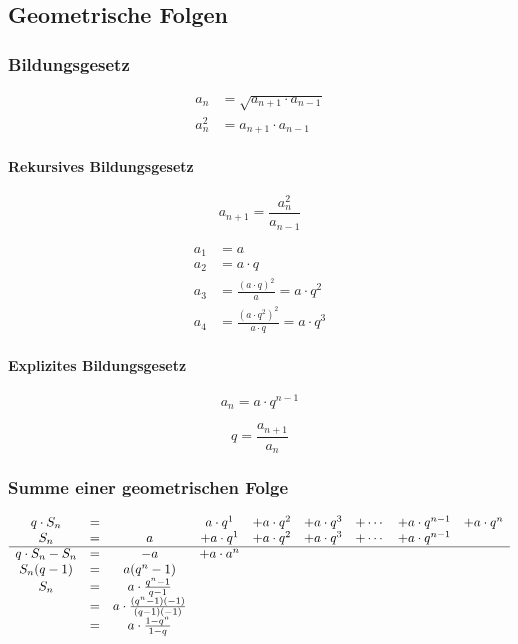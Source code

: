 \subsection{Geometrische Folgen}

\subsubsection{Bildungsgesetz}

\begin{align*}
    a_n &= \sqrt{a_{n+1} \cdot a_{n-1}} \\
    a_n^2 &= a_{n+1} \cdot a_{n-1}
\end{align*}

\begin{gesetz}
    \paragraph{Rekursives Bildungsgesetz}
    \[
        a_{n+1} = \frac{a_n^2}{a_{n-1}}  
    \]
\end{gesetz}

\begin{align*}
    a_1 &= a \\
    a_2 &= a \cdot q \\
    a_3 &= \frac{{(a \cdot q)}^2}{a} = a \cdot q^2 \\
    a_4 &= \frac{{(a \cdot q^2)}^2}{a \cdot q} = a \cdot q^3
\end{align*}

\begin{gesetz}
    \paragraph{Explizites Bildungsgesetz}
    \[
        a_n = a \cdot q^{n-1}  
    \]
\end{gesetz}

\[
    q = \frac{a_{n+1}}{a_n}
\]

\subsubsection{Summe einer geometrischen Folge}

\[
    \begin{array}{ccccccccc}
        q \cdot S_n &=& & a \cdot q^1 &+ a \cdot q^2 &+ a \cdot q^3 &+ \cdots &+ a \cdot q^{n-1} &+ a \cdot q^n \\
        S_n &=& a &+ a \cdot q^1 &+ a \cdot q^2 &+ a \cdot q^3 &+ \cdots &+ a \cdot q^{n-1} & \\
        \cline{1-9}
        q \cdot S_n - S_n &=& -a &+ a \cdot a^n &&&&& \\
        S_n(q-1) &=& a(q^n -1) &&&&&& \\
        S_n &=& a \cdot \frac{q^n - 1}{q - 1} &&&&&& \\
        &=& a \cdot \frac{(q^n - 1)(-1)}{(q - 1)(-1)} &&&&&& \\
        &=& a \cdot \frac{1- q^n}{1 - q} &&&&&& \\
    \end{array}  
\]

